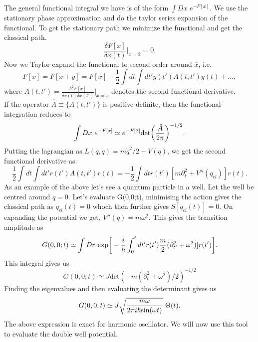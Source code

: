 \documentclass[a4paper, 12pt]{article}
\begin{document}
The general functional integral we have is of the form $\int Dx $ $e^{-F[x]}$. We use the stationary phase approximation and do the taylor series expansion of the functional. To get the stationary path we minimize the functional and get the classical path.
\begin{equation}
\frac{\delta F[x]}{\delta x(t)} \Bigg|_{x=\bar{x}} = 0.
\end{equation}
Now we Taylor expand the functional to second order around $\bar{x}$, i.e.
\begin{equation}
F[x] = F[\bar{x}+y] = F[\bar{x}] + \frac{1}{2}\int dt \int dt' y(t')A(t,t')y(t) + ... ,
\end{equation}
where $A(t,t') = \frac{\delta^2 F[x]}{\delta x(t) \delta x(t')} \bigg|_{x=\bar{x}}$ denotes the second functional derivative.\\
If the operator $\hat{A} \equiv \{A(t,t')\}$ is positive definite, then the functional integration reduces to
\begin{equation}
\int Dx \*\ e^{-F[x]} \simeq e^{-F[\bar{x}]} \textrm{det}\bigg(\frac{\hat{A}}{2\pi}\bigg)^{-1/2}.
\end{equation}
Putting the lagrangian as $L(q,\dot{q}) = m\dot{q}^2/2 - V(q)$, we get the second functional derivative as:
\begin{equation}
 \frac{1}{2}\int dt \int dt' r(t')A(t,t')r(t) =  -\frac{1}{2}\int dt  r(t')[m\partial^2_t + V''(q_{cl})]r(t).
\end{equation}
As an example of the above let's see a quantum particle in a well. Let the well be centred around $q=0$. Let's evaluate G(0,0;t), minimising the action gives the classical path as $q_{cl}(t)=0$ whoch then further gives $S[q_{cl}(t)]=0$. On expanding the potential we get, $V''(q)= m\omega^2$. This gives the transition amplitude as
\begin{equation}
G(0,0;t) \simeq \int Dr \*\ \textrm{exp} \bigg[-\frac{i}{\hbar}\int_0^t dt'  r(t')\frac{m}{2}(\partial^2_{t'} + \omega^2)]r(t')\bigg].
\end{equation}
This integral gives us
\begin{equation}
G(0,0;t) \simeq J \textrm{det}(-m(\partial^2_{t} + \omega^2)/2)^{-1/2}
\end{equation}
Finding the eigenvalues and then evaluating the determinant gives us
\begin{equation}
G(0,0;t) \simeq J \sqrt{\frac{m\omega}{2\pi i \hbar \textrm{sin}(\omega t)}} \*\ \Theta(t).
\end{equation}
The above expression is exact for harmonic oscillator. We will now use this tool to evaluate the double well potential.
\end{document}
